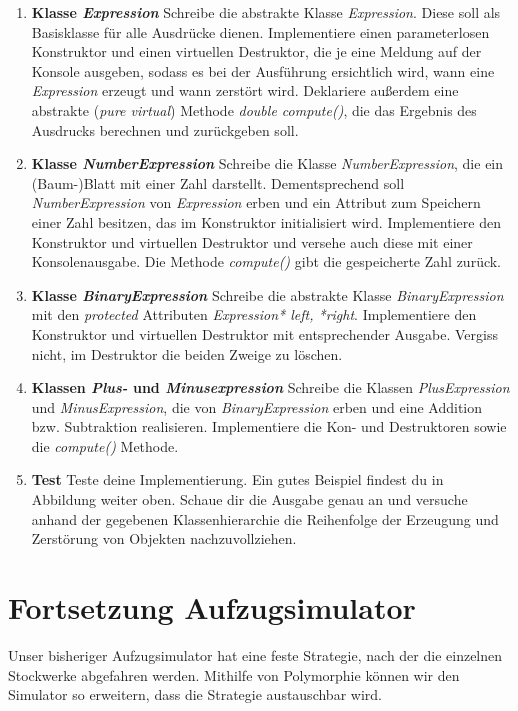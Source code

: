 \begin{enumerate}

\item \textbf{Klasse \emph{Expression}}
Schreibe die abstrakte Klasse \emph{Expression}.
Diese soll als Basisklasse für alle Ausdrücke dienen.
Implementiere einen parameterlosen Konstruktor und einen virtuellen Destruktor, die je eine Meldung auf der Konsole ausgeben, sodass es bei der Ausführung ersichtlich wird, wann eine \emph{Expression} erzeugt und wann zerstört wird.
Deklariere außerdem eine abstrakte (\emph{pure virtual}) Methode \emph{double compute()}, die das Ergebnis des Ausdrucks berechnen und zurückgeben soll. 

\item \textbf{Klasse \emph{NumberExpression}}
Schreibe die Klasse \emph{NumberExpression}, die ein (Baum-)Blatt mit einer Zahl darstellt.
Dementsprechend soll \emph{NumberExpression} von \emph{Expression} erben und ein Attribut zum Speichern einer Zahl besitzen, das im Konstruktor initialisiert wird.
Implementiere den Konstruktor und virtuellen Destruktor und versehe auch diese mit einer Konsolenausgabe.
Die Methode \emph{compute()} gibt die gespeicherte Zahl zurück.

\item \textbf{Klasse \emph{BinaryExpression}}
Schreibe die abstrakte Klasse \emph{BinaryExpression} mit den \emph{protected} Attributen \emph{Expression* left, *right}.
Implementiere den Konstruktor und virtuellen Destruktor mit entsprechender Ausgabe.
Vergiss nicht, im Destruktor die beiden Zweige zu löschen. 

\item \textbf{Klassen \emph{Plus-} und \emph{Minusexpression}}
Schreibe die Klassen \emph{PlusExpression} und \emph{MinusExpression}, die von \emph{BinaryExpression} erben und eine Addition bzw. Subtraktion realisieren. 
Implementiere die Kon- und Destruktoren sowie die \emph{compute()} Methode.

\item \textbf{Test}
Teste deine Implementierung.
Ein gutes Beispiel findest du in Abbildung weiter oben.
Schaue dir die Ausgabe genau an und versuche anhand der gegebenen Klassenhierarchie die Reihenfolge der Erzeugung und Zerstörung von Objekten  nachzuvollziehen.

\end{enumerate}

\section{Fortsetzung Aufzugsimulator}
Unser bisheriger Aufzugsimulator hat eine feste Strategie, nach der die einzelnen Stockwerke abgefahren werden. Mithilfe von Polymorphie können wir den Simulator so erweitern, dass die Strategie austauschbar wird.  

